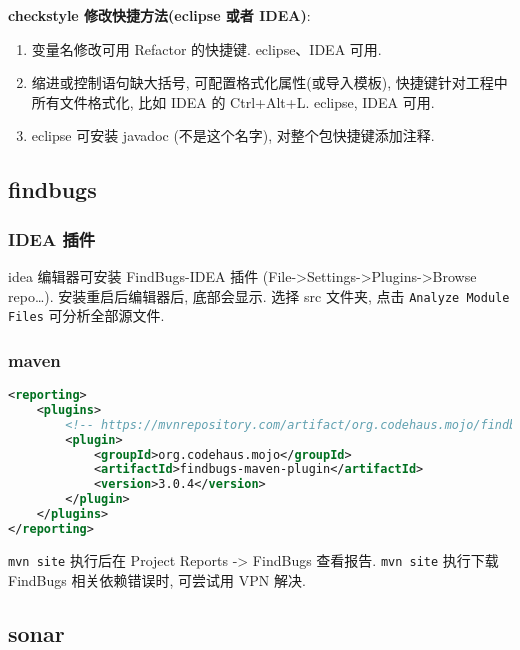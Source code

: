 \textbf{checkstyle 修改快捷方法(eclipse 或者 IDEA)}:

\begin{enumerate}
\def\labelenumi{\arabic{enumi}.}
\tightlist
\item
  变量名修改可用 Refactor 的快捷键. eclipse、IDEA 可用.
\item
  缩进或控制语句缺大括号, 可配置格式化属性(或导入模板),
  快捷键针对工程中所有文件格式化, 比如 IDEA 的 Ctrl+Alt+L. eclipse, IDEA
  可用.
\item
  eclipse 可安装 javadoc (不是这个名字), 对整个包快捷键添加注释.
\end{enumerate}

\subsection{findbugs}\label{findbugs}

\subsubsection{IDEA 插件}\label{idea-ux63d2ux4ef6}

idea 编辑器可安装 FindBugs-IDEA 插件
(File-\textgreater{}Settings-\textgreater{}Plugins-\textgreater{}Browse
repo\ldots{}). 安装重启后编辑器后, 底部会显示. 选择 src 文件夹, 点击
\lstinline!Analyze Module Files! 可分析全部源文件.

\subsubsection{maven}\label{maven-1}

\begin{lstlisting}[language=XML]
<reporting>
    <plugins>
        <!-- https://mvnrepository.com/artifact/org.codehaus.mojo/findbugs-maven-plugin -->
        <plugin>
            <groupId>org.codehaus.mojo</groupId>
            <artifactId>findbugs-maven-plugin</artifactId>
            <version>3.0.4</version>
        </plugin>
    </plugins>
</reporting>
\end{lstlisting}

\lstinline!mvn site! 执行后在 Project Reports -\textgreater{} FindBugs
查看报告. \lstinline!mvn site! 执行下载 FindBugs 相关依赖错误时,
可尝试用 VPN 解决.

\subsection{sonar}\label{sonar}

